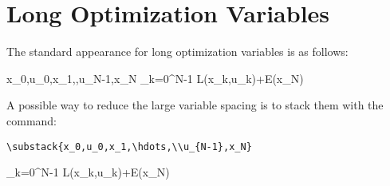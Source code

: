 \documentclass[a4paper]{article}
\begin{document}
\section{Long Optimization Variables}
The standard appearance for long optimization variables is as follows:

\begin{mini!}
	{x_0,u_0,x_1,\hdots,u_{N-1},x_N}
	{\sum_{k=0}^{N-1} L(x_k,u_k)\!\!+\!\!E(x_N)\label{OCPobj}}
	{\label{eq:OCP}}{}
\end{mini!}

\noindent A possible way to reduce the large variable spacing is to stack them with the command: \begin{verbatim}
\substack{x_0,u_0,x_1,\hdots,\\u_{N-1},x_N}
\end{verbatim}

\begin{mini!}
	{}
	{\sum_{k=0}^{N-1} L(x_k,u_k)\!\!+\!\!E(x_N)\label{OCPobj}}
	{\label{eq:OCP}}{}
\end{mini!}
\end{document}
